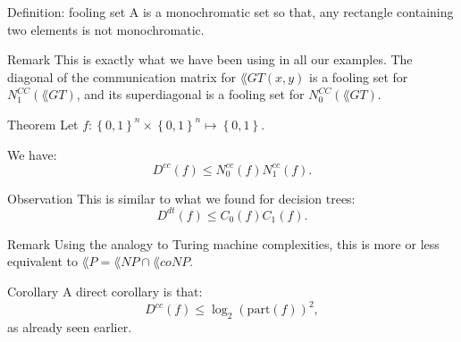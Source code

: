 \documentclass[a4paper]{article}
\begin{document}
\begin{parag}{Definition: fooling set}
    A  is a monochromatic set so that, any rectangle containing two elements is not monochromatic.

    \begin{subparag}{Remark}
        This is exactly what we have been using in all our examples. The diagonal of the communication matrix for $\lang{GT}\left(x, y\right)$ is a fooling set for $N_1^{CC}\left(\lang{GT}\right)$, and its superdiagonal is a fooling set for $N_0^{CC}\left(\lang{GT}\right)$.
    \end{subparag}
\end{parag}

\begin{parag}{Theorem}
    Let $f: \left\{0, 1\right\}^n \times \left\{0, 1\right\}^n \mapsto \left\{0, 1\right\}$.

    We have: 
    \[D^{cc}\left(f\right) \leq N_0^{cc}\left(f\right) N_1^{cc}\left(f\right).\]

    \begin{subparag}{Observation}
        This is similar to what we found for decision trees: 
        \[D^{dt}\left(f\right) \leq C_0\left(f\right) C_1\left(f\right).\]
    \end{subparag}
    
    \begin{subparag}{Remark}
        Using the analogy to Turing machine complexities, this is more or less equivalent to $\lang{P} = \lang{NP} \cap \lang{coNP}$.
    \end{subparag}

    \begin{subparag}{Corollary}
        A direct corollary is that:
        \[D^{cc}\left(f\right) \leq \log_2\left(\text{part}\left(f\right)\right)^2,\]
        as already seen earlier.
    \end{subparag}
\end{parag}
\end{document}

